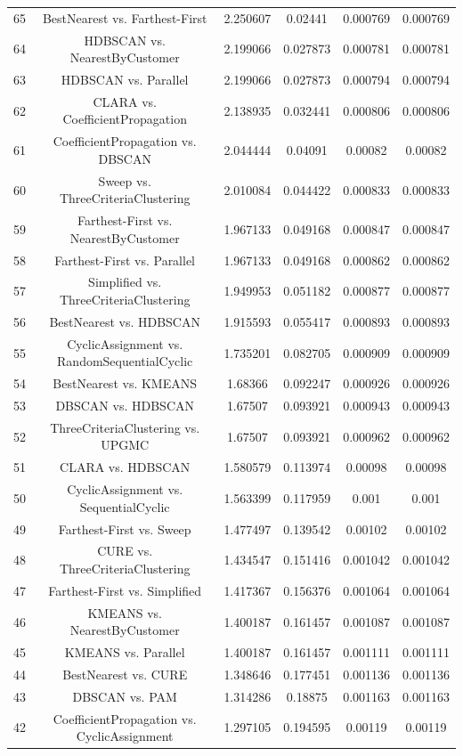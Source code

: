 \documentclass[a4paper,10pt]{article}
\begin{document}
\begin{landscape}
\begin{table}[!htp]
\begin{tabular}{cccccc}
65&BestNearest vs. Farthest-First&2.250607&0.02441&0.000769&0.000769\\
64&HDBSCAN vs. NearestByCustomer&2.199066&0.027873&0.000781&0.000781\\
63&HDBSCAN vs. Parallel&2.199066&0.027873&0.000794&0.000794\\
62&CLARA vs. CoefficientPropagation&2.138935&0.032441&0.000806&0.000806\\
61&CoefficientPropagation vs. DBSCAN&2.044444&0.04091&0.00082&0.00082\\
60&Sweep vs. ThreeCriteriaClustering&2.010084&0.044422&0.000833&0.000833\\
59&Farthest-First vs. NearestByCustomer&1.967133&0.049168&0.000847&0.000847\\
58&Farthest-First vs. Parallel&1.967133&0.049168&0.000862&0.000862\\
57&Simplified vs. ThreeCriteriaClustering&1.949953&0.051182&0.000877&0.000877\\
56&BestNearest vs. HDBSCAN&1.915593&0.055417&0.000893&0.000893\\
55&CyclicAssignment vs. RandomSequentialCyclic&1.735201&0.082705&0.000909&0.000909\\
54&BestNearest vs. KMEANS&1.68366&0.092247&0.000926&0.000926\\
53&DBSCAN vs. HDBSCAN&1.67507&0.093921&0.000943&0.000943\\
52&ThreeCriteriaClustering vs. UPGMC&1.67507&0.093921&0.000962&0.000962\\
51&CLARA vs. HDBSCAN&1.580579&0.113974&0.00098&0.00098\\
50&CyclicAssignment vs. SequentialCyclic&1.563399&0.117959&0.001&0.001\\
49&Farthest-First vs. Sweep&1.477497&0.139542&0.00102&0.00102\\
48&CURE vs. ThreeCriteriaClustering&1.434547&0.151416&0.001042&0.001042\\
47&Farthest-First vs. Simplified&1.417367&0.156376&0.001064&0.001064\\
46&KMEANS vs. NearestByCustomer&1.400187&0.161457&0.001087&0.001087\\
45&KMEANS vs. Parallel&1.400187&0.161457&0.001111&0.001111\\
44&BestNearest vs. CURE&1.348646&0.177451&0.001136&0.001136\\
43&DBSCAN vs. PAM&1.314286&0.18875&0.001163&0.001163\\
42&CoefficientPropagation vs. CyclicAssignment&1.297105&0.194595&0.00119&0.00119\\

\end{tabular}
\end{table}
\end{landscape}
\end{document}
